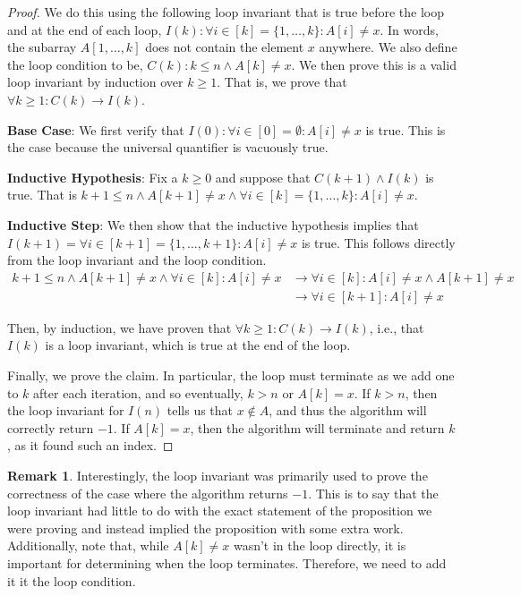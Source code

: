 \documentclass{article}
\theoremstyle{plain}
\theoremstyle{definition}
\newtheorem{remark}[theorem]{Remark}
\newcommand{\ra}{\rightarrow}
\begin{document}
\begin{proof}
    We do this using the following loop invariant that is true before the loop and at the end of each loop, \(I(k) : \forall i \in [k] = \{1, \dotsc, k\} : A[i] \neq x\). In words, the subarray \(A[1,\dotsc,k]\) does not contain the element \(x\) anywhere. We also define the loop condition to be, \(C(k) : k \leq n \land A[k] \neq x\). We then prove this is a valid loop invariant by induction over \(k \geq 1\). That is, we prove that \(\forall k \geq 1 : C(k) \ra I(k)\).
    
    \textbf{Base Case}: We first verify that \(I(0) : \forall i \in [0] = \emptyset : A[i] \neq x\) is true. This is the case because the universal quantifier is vacuously true.

    \textbf{Inductive Hypothesis}: Fix a \(k \geq 0\) and suppose that \(C(k+1) \land I(k)\) is true. That is \(k+1 \leq n \land A[k+1] \neq x \land \forall i \in [k] = \{1, \dotsc, k\} : A[i] \neq x\).

    \textbf{Inductive Step}: We then show that the inductive hypothesis implies that \(I(k+1) = \forall i \in [k+1] = \{1, \dotsc, k+1\} : A[i] \neq x\) is true. This follows directly from the loop invariant and the loop condition.
    \begin{align*}
        k+1 \leq n \land A[k+1] \neq x \land \forall i \in [k] : A[i] \neq x &\rightarrow \forall i \in [k] : A[i] \neq x \land A[k+1] \neq x \\
        &\rightarrow \forall i \in [k+1] : A[i] \neq x
    \end{align*}

    Then, by induction, we have proven that \(\forall k \geq 1 : C(k) \ra I(k)\), i.e., that \(I(k)\) is a loop invariant, which is true at the end of the loop. 

    Finally, we prove the claim. In particular, the loop must terminate as we add one to \(k\) after each iteration, and so eventually, \(k > n\) or \(A[k] = x\). If \(k > n\), then the loop invariant for \(I(n)\) tells us that \(x \notin A\), and thus the algorithm will correctly return \(-1\). If \(A[k] = x\), then the algorithm will terminate and return \(k\), as it found such an index.
\end{proof}

\begin{remark}
    Interestingly, the loop invariant was primarily used to prove the correctness of the case where the algorithm returns \(-1\). This is to say that the loop invariant had little to do with the exact statement of the proposition we were proving and instead implied the proposition with some extra work. Additionally, note that, while \(A[k] \neq x\) wasn't in the loop directly, it is important for determining when the loop terminates. Therefore, we need to add it it the loop condition. 
\end{remark}
\end{document}
